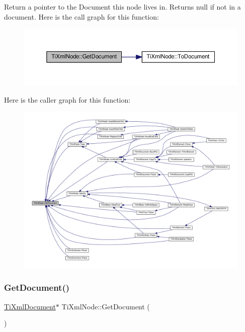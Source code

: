 Return a pointer to the Document this node lives in. Returns null if not in a document. Here is the call graph for this function\+:\nopagebreak
\begin{figure}[H]
\begin{center}
\leavevmode
\includegraphics[width=350pt]{class_ti_xml_node_adcb070acefcbaedaa0673d82e530538b_cgraph}
\end{center}
\end{figure}
Here is the caller graph for this function\+:\nopagebreak
\begin{figure}[H]
\begin{center}
\leavevmode
\includegraphics[width=350pt]{class_ti_xml_node_adcb070acefcbaedaa0673d82e530538b_icgraph}
\end{center}
\end{figure}
\mbox{\label{class_ti_xml_node_a7b2372c0e7adfb32f5b6902fe49a39b2}} 
\subsubsection{\texorpdfstring{Get\+Document()}{GetDocument()}\hspace{0.1cm}{\footnotesize\ttfamily [2/2]}}
{\footnotesize\ttfamily \hyperlink{class_ti_xml_document}{Ti\+Xml\+Document}$\ast$ Ti\+Xml\+Node\+::\+Get\+Document (\begin{DoxyParamCaption}{ }\end{DoxyParamCaption})\hspace{0.3cm}{\ttfamily [inline]}}

